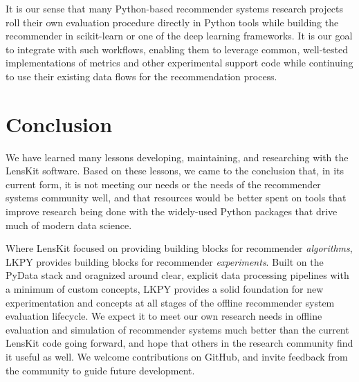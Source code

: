It is our sense that many Python-based recommender systems research projects roll their own evaluation procedure directly in Python tools while building the recommender in scikit-learn or one of the deep learning frameworks.
It is our goal to integrate with such workflows, enabling them to leverage common, well-tested implementations of metrics and other experimental support code while continuing to use their existing data flows for the recommendation process.

\section{Conclusion}

We have learned many lessons developing, maintaining, and researching with the LensKit software.
Based on these lessons, we came to the conclusion that, in its current form, it is not meeting our needs or the needs of the recommender systems community well, and that resources would be better spent on tools that improve research being done with the widely-used Python packages that drive much of modern data science.

Where LensKit focused on providing building blocks for recommender \emph{algorithms}, LKPY provides building blocks for recommender \emph{experiments}.
Built on the PyData stack and oragnized around clear, explicit data processing pipelines with a minimum of custom concepts, LKPY provides a solid foundation for new experimentation and concepts at all stages of the offline recommender system evaluation lifecycle.
We expect it to meet our own research needs in offline evaluation and simulation of recommender systems much better than the current LensKit code going forward, and hope that others in the research community find it useful as well.
We welcome contributions on GitHub, and invite feedback from the community to guide future development.